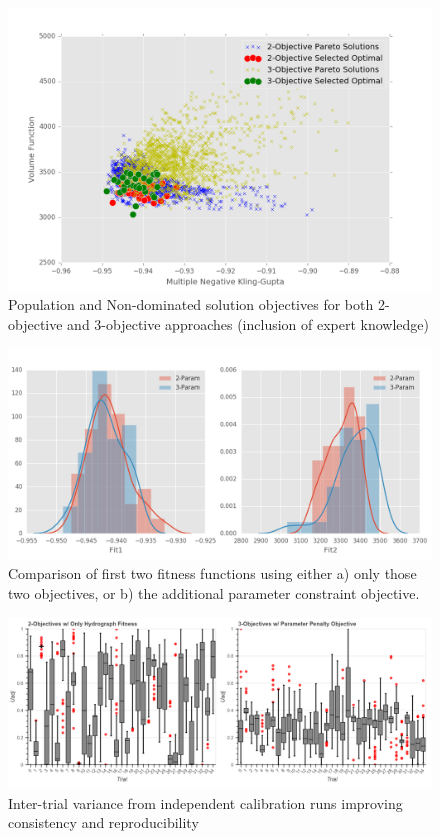 \documentclass[11pt]{article} %
\begin{document}
\begin{figure}
\centering
\noindent\includegraphics[scale=.7]{./Figures/Objective_Compare.png} 
\caption{Population and Non-dominated solution objectives for both 2-objective and 3-objective approaches (inclusion of expert knowledge)}
\label{Objective_Compare}
\end{figure}

\begin{figure}
\centering
\noindent\includegraphics[scale=.6]{./Figures/Fitness_Compare.png} 
\caption{Comparison of first two fitness functions using either a) only those two objectives, or b) the additional parameter constraint objective.}
\label{Fitness_Compare}
\end{figure}

\begin{figure}
\centering
\noindent\includegraphics[scale=.5]{./Figures/Reduced_Variance_UADJ.png} 
\caption{Inter-trial variance from independent calibration runs improving consistency and reproducibility}
\label{Reduced_Variance}
\end{figure}
\end{document}
